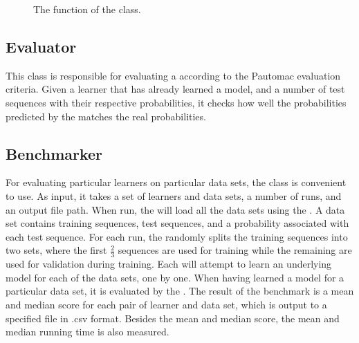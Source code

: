 \begin{figure}
\caption{The  function of the  class.}
\label{code:learner}
\end{figure}


\subsection{Evaluator}
This class is responsible for evaluating a  according to the Pautomac evaluation criteria.
Given a learner that has already learned a model, and a number of test sequences with their respective probabilities, it checks how well the probabilities predicted by the  matches the real probabilities.


\subsection{Benchmarker}
For evaluating particular learners on particular data sets, the  class is convenient to use.
As input, it takes a set of learners and data sets, a number of runs, and an output file path.
When run, the  will load all the data sets using the . A data set contains training sequences, test sequences, and a probability associated with each test sequence. For each run, the  randomly splits the training sequences into two sets, where the first $\frac{2}{3}$ sequences are used for training while the remaining are used for validation during training.
Each  will attempt to learn an underlying model for each of the data sets, one by one. When having learned a model for a particular data set, it is evaluated by the . The result of the benchmark is a mean and median score for each pair of learner and data set, which is output to a specified file in .csv format. Besides the mean and median score, the mean and median running time is also measured.